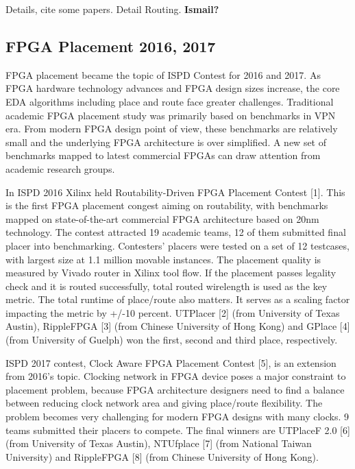 \documentclass[sigconf]{acmart}
\begin{document}
Details, cite some papers.
Detail Routing.
{\bf Ismail?}



\subsection{FPGA Placement 2016, 2017}

FPGA placement became the topic of ISPD Contest for 2016 and 2017. As
FPGA hardware technology advances and FPGA design sizes increase, the
core EDA algorithms including place and route face greater
challenges. Traditional academic FPGA placement study was primarily
based on benchmarks in VPN era. From modern FPGA design point of view,
these benchmarks are relatively small and the underlying FPGA
architecture is over simplified. A new set of benchmarks mapped to
latest commercial FPGAs can draw attention from academic research
groups.

In ISPD 2016 Xilinx held Routability-Driven FPGA Placement Contest
\cite{sy1}[1]. This is the first FPGA placement congest aiming on routability,
with benchmarks mapped on state-of-the-art commercial FPGA
architecture based on 20nm technology. The contest attracted 19
academic teams, 12 of them submitted final placer into
benchmarking. Contesters' placers were tested on a set of 12
testcases, with largest size at 1.1 million movable instances. The
placement quality is measured by Vivado router in Xilinx tool flow. If
the placement passes legality check and it is routed successfully,
total routed wirelength is used as the key metric. The total runtime
of place/route also matters. It serves as a scaling factor impacting
the metric by +/-10 percent.  UTPlacer\cite{sy2} [2] (from University of Texas
Austin), RippleFPGA\cite{sy3} [3] (from Chinese University of Hong Kong) and
GPlace\cite{sy4} [4] (from University of Guelph) won the first, second and third
place, respectively.

ISPD 2017 contest, Clock Aware FPGA Placement Contest\cite{sy5} [5], is an
extension from 2016’s topic. Clocking network in FPGA device poses a
major constraint to placement problem, because FPGA architecture
designers need to find a balance between reducing clock network area
and giving place/route flexibility. The problem becomes very
challenging for modern FPGA designs with many clocks. 9 teams
submitted their placers to compete. The final winners are UTPlaceF 2.0
\cite{sy6}[6] (from University of Texas Austin), NTUfplace\cite{sy7} [7] (from National
Taiwan University) and RippleFPGA\cite{sy8} [8] (from Chinese University of Hong
Kong).
\end{document}
